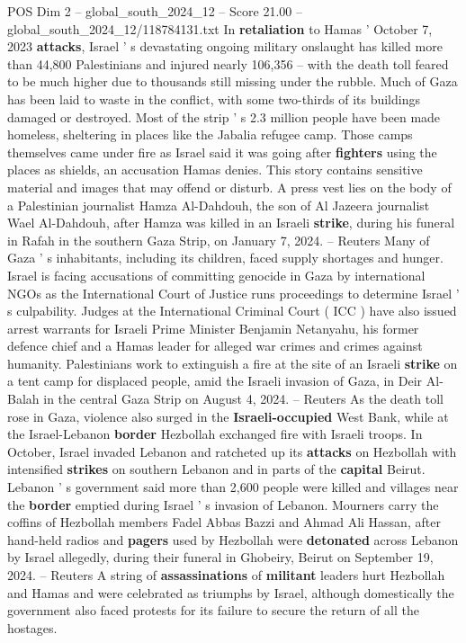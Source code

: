 \begin{textsample}{POS Dim 2 – global\_south\_2024\_12 – Score 21.00 – global\_south\_2024\_12/118784131.txt}  \label{ex:f2_pos_204}
In \textbf{retaliation} to Hamas ' October 7, 2023 \textbf{attacks}, Israel ' s devastating ongoing military onslaught has killed more than 44,800 Palestinians and injured nearly 106,356 -- with the death toll feared to be much higher due to thousands still missing under the rubble.
Much of Gaza has been laid to waste in the conflict, with some two-thirds of its buildings damaged or destroyed.
Most of the strip ' s 2.3 million people have been made homeless, sheltering in places like the Jabalia refugee camp.
Those camps themselves came under fire as Israel said it was going after \textbf{fighters} using the places as shields, an accusation Hamas denies.
This story contains sensitive material and images that may offend or disturb.
A press vest lies on the body of a Palestinian journalist Hamza Al-Dahdouh, the son of Al Jazeera journalist Wael Al-Dahdouh, after Hamza was killed in an Israeli \textbf{strike}, during his funeral in Rafah in the southern Gaza Strip, on January 7, 2024. -- Reuters Many of Gaza ' s inhabitants, including its children, faced supply shortages and hunger.
Israel is facing accusations of committing genocide in Gaza by international NGOs as the International Court of Justice runs proceedings to determine Israel ' s culpability.
Judges at the International Criminal Court ( ICC ) have also issued arrest warrants for Israeli Prime Minister Benjamin Netanyahu, his former defence chief and a Hamas leader for alleged war crimes and crimes against humanity.
Palestinians work to extinguish a fire at the site of an Israeli \textbf{strike} on a tent camp for displaced people, amid the Israeli invasion of Gaza, in Deir Al-Balah in the central Gaza Strip on August 4, 2024. -- Reuters As the death toll rose in Gaza, violence also surged in the \textbf{Israeli-occupied} West Bank, while at the Israel-Lebanon \textbf{border} Hezbollah exchanged fire with Israeli troops.
In October, Israel invaded Lebanon and ratcheted up its \textbf{attacks} on Hezbollah with intensified \textbf{strikes} on southern Lebanon and in parts of the \textbf{capital} Beirut.
Lebanon ' s government said more than 2,600 people were killed and villages near the \textbf{border} emptied during Israel ' s invasion of Lebanon.
Mourners carry the coffins of Hezbollah members Fadel Abbas Bazzi and Ahmad Ali Hassan, after hand-held radios and \textbf{pagers} used by Hezbollah were \textbf{detonated} across Lebanon by Israel allegedly, during their funeral in Ghobeiry, Beirut on September 19, 2024. -- Reuters A string of \textbf{assassinations} of \textbf{militant} leaders hurt Hezbollah and Hamas and were celebrated as triumphs by Israel, although domestically the government also faced protests for its failure to secure the return of all the hostages.

\end{textsample}
